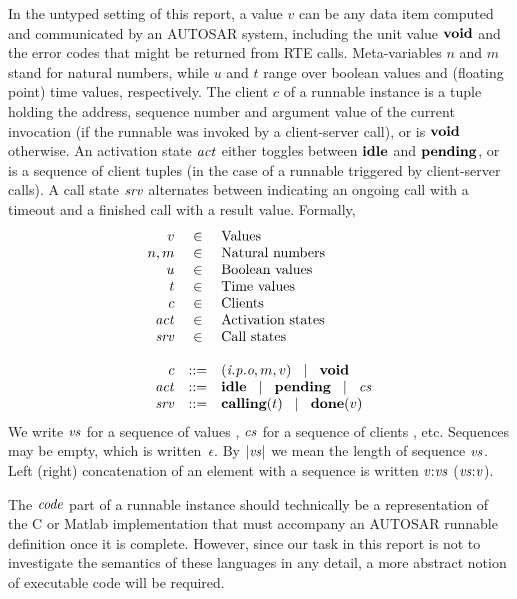 \documentclass[twocolumn]{article}
\begin{document}
In the untyped setting of this report, a value $v$ can be any data item computed and communicated by an AUTOSAR system, including the unit value $\textbf{void}$ and the error codes that might be returned from RTE calls. Meta-variables $n$ and $m$ stand for natural numbers, while $u$ and $t$ range over boolean values and (floating point) time values, respectively. The client $c$ of a runnable instance is a tuple holding the address, sequence number and argument value of the current invocation (if the runnable was invoked by a client-server call), or is $\textbf{void}$ otherwise. An activation state $\Act$ either toggles between $\textbf{idle}$ and $\textbf{pending}$, or is a sequence of client tuples (in the case of a runnable triggered by client-server calls). A call state $\Srv$ alternates between indicating an ongoing call with a timeout and a finished call with a result value.
Formally,
\[
\begin{array}{rcll}
  v        & \in & \text{Values} \\
  n,m      & \in & \text{Natural numbers} \\
  u        & \in & \text{Boolean values} \\
  t        & \in & \text{Time values} \\
  c        & \in & \text{Clients} \\
  \Act     & \in & \text{Activation states} \\
  \Srv     & \in & \text{Call states} \\ \\
  c        & ::= & \Tclient {\Top o p i} m v \sep \Tvoid \\
  \Act     & ::= & \Tidle \sep \Tpending \sep \Cs \\
  \Srv     & ::= & \Tcalling t \sep \Tdone v
\end{array}
\]
We write $\Vs$ for a sequence of values , $\Cs$ for a sequence of clients , etc. Sequences may be empty, which is written~$\epsilon$. By $\Tlength{\Vs}$ we mean the length of sequence $\Vs$. Left (right) concatenation of an element with a sequence is written $\Tcons{\V{V}}{\V{Vs}}$ ($\Tsnoc{\V{Vs}}{\V{V}}$).

The $\Code$ part of a runnable instance should technically be a representation of the C or Matlab implementation that must accompany an AUTOSAR runnable definition once it is complete. However, since our task in this report is not to investigate the semantics of these languages in any detail, a more abstract notion of executable code will be required.
\end{document}
